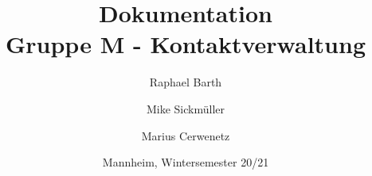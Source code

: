 
 \subject{Mobile Anwendungen}   %

\title{Dokumentation\\Gruppe M - Kontaktverwaltung}

\author{Raphael Barth \and Mike Sickmüller \and Marius Cerwenetz}

\date{Mannheim, Wintersemester 20/21}





